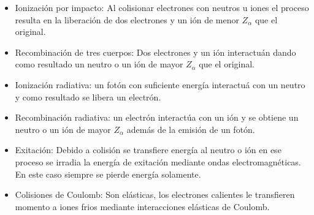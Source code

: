 \documentclass[11pt]{article}
\theoremstyle{definition}
\begin{document}
  \begin{itemize}
    \item Ionizaci\'on por impacto: Al colisionar electrones con neutros u iones el proceso resulta en la liberaci\'on de dos electrones y un i\'on de menor $Z_\alpha$ que el original. 
    \item Recombinaci\'on de tres cuerpos: Dos electrones y un i\'on interactu\'an dando como resultado un neutro o un i\'on de mayor $Z_\alpha$ que el original.
    \item Ionizaci\'on radiativa: un fot\'on con suficiente energ\'ia interactu\'a con un neutro y como resultado se libera un electr\'on. 
  \item Recombinaci\'on radiativa: un electr\'on interact\'ua con un i\'on y se obtiene un neutro o un i\'on de mayor $Z_\alpha$ adem\'as de la emisi\'on de un fot\'on.
  \item Exitaci\'on: Debido a colisi\'on se transfiere energ\'ia al neutro o i\'on en ese proceso se irradia la energ\'ia de exitaci\'on mediante ondas electromagn\'eticas. En este caso siempre se pierde energ\'ia solamente.
  \item Colisiones de Coulomb: Son el\'asticas, los electrones calientes le transfieren momento a iones frios mediante interacciones el\'asticas de Coulomb.
  \end{itemize} 
\end{document}
